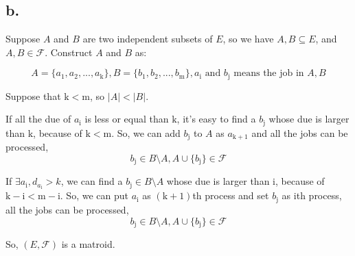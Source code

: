 \documentclass{article}
\begin{document}
{    \subsection*{b.}{
        Suppose \(\mathit{A}\) and \(\mathit{B}\) are two independent subsets of \(\mathit{E}\), so we have \(\mathit{A}, \mathit{B} \subseteq \mathit{E}\), and \(\mathit{A}, \mathit{B} \in \mathcal{F}\). Construct \(\mathit{A}\) and \(\mathit{B}\) as:

        \[\mathit{A}=\{ \mathit{a}_{\mathrm{1}}, \mathit{a}_{\mathrm{2}}, ..., \mathit{a}_{\mathrm{k}}\}, \mathit{B}=\{ \mathit{b}_{\mathrm{1}}, \mathit{b}_{\mathrm{2}}, ..., \mathit{b}_{\mathrm{m}}\}, \mathit{a}_{\mathrm{i}} \text{ and } \mathit{b}_{\mathrm{j}} \text{ means the job in }\mathit{A}, \mathit{B}\]

        Suppose that \(\mathrm{k} < \mathrm{m}\), so \(\lvert \mathit{A} \rvert < \lvert \mathit{B} \rvert\).

        If all the due of \(\mathit{a}_{\mathrm{i}}\) is less or equal than \(\mathrm{k}\), it's easy to find a \(\mathit{b}_{\mathrm{j}}\) whose due is larger than \(\mathrm{k}\), because of \(\mathrm{k} < \mathrm{m}\). So, we can add \(\mathit{b}_{\mathrm{j}}\) to \(\mathit{A}\) as \(\mathit{a}_{\mathrm{k+1}}\) and all the jobs can be processed, 
        \[\mathit{b}_{\mathrm{j}} \in \mathit{B} \setminus \mathit{A}, \mathit{A} \cup \{ \mathit{b}_{\mathrm{j}} \} \in \mathcal{F}\]

        If \(\exists \mathit{a}_{\mathrm{i}}, \mathit{d}_{\mathit{a}_{\mathrm{i}}}>k\), we can find a \(\mathit{b}_{\mathrm{j}} \in \mathit{B} \setminus \mathit{A}\) whose due is larger than \(\mathrm{i}\), because of \(\mathrm{k-i} < \mathrm{m-i}\). So, we can put \(\mathit{a}_{\mathrm{i}}\) as \((\mathrm{k+1})\)th process and set \(\mathit{b}_{\mathrm{j}}\) as \(\mathrm{i}\)th process, all the jobs can be processed,
        \[\mathit{b}_{\mathrm{j}} \in \mathit{B} \setminus \mathit{A}, \mathit{A} \cup \{ \mathit{b}_{\mathrm{j}} \} \in \mathcal{F}\]

        So, \((\mathit{E},\mathcal{F})\) is a matroid.
    }
}
\end{document}
